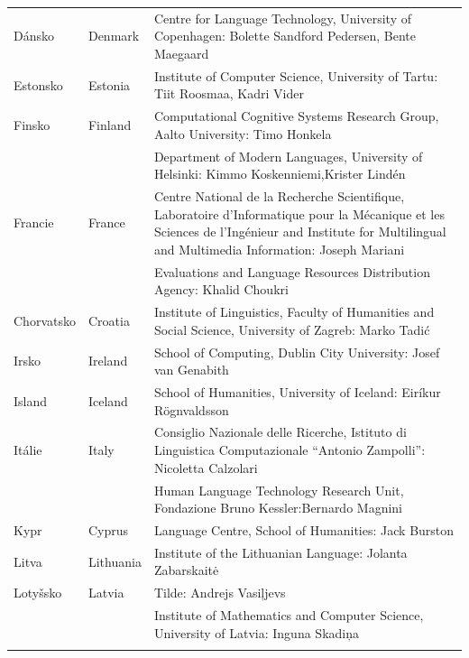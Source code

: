 \begin{longtable}{@{}llp{113mm}@{}}
  Dánsko &  \textcolor{grey1}{Denmark} & Centre for Language Technology, University of Copenhagen: \newline Bolette Sandford Pedersen, Bente Maegaard\\ \addlinespace
  Estonsko & \textcolor{grey1}{Estonia} & Institute of Computer Science, University of Tartu: Tiit Roosmaa, Kadri Vider\\ \addlinespace
  Finsko & \textcolor{grey1}{Finland} & Computational Cognitive Systems Research Group, Aalto University: Timo Honkela\\ \addlinespace
  & & Department of Modern Languages, University of Helsinki: Kimmo Koskenniemi,\newline Krister Lindén \\ \addlinespace
  Francie & \textcolor{grey1}{France} & Centre National de la Recherche Scientifique, Laboratoire d'Informatique pour la Mécanique et les Sciences de l'Ingénieur and Institute for Multilingual and Multimedia Information: Joseph Mariani \\ \addlinespace
  & & Evaluations and Language Resources Distribution Agency: Khalid Choukri\\ \addlinespace
  Chorvatsko & \textcolor{grey1}{Croatia} & Institute of Linguistics, Faculty of Humanities and Social Science, University of Zagreb: Marko Tadić \\ \addlinespace
  Irsko & \textcolor{grey1}{Ireland} & School of Computing, Dublin City University: Josef van Genabith\\ \addlinespace
  Island & \textcolor{grey1}{Iceland} & School of Humanities, University of Iceland: Eiríkur Rögnvaldsson\\ \addlinespace
  Itálie & \textcolor{grey1}{Italy} & Consiglio Nazionale delle Ricerche, Istituto di Linguistica Computazionale “Antonio Zampolli”: Nicoletta Calzolari\\ \addlinespace
  & & Human Language Technology Research Unit, Fondazione Bruno Kessler:\newline Bernardo Magnini\\ \addlinespace
  Kypr & \textcolor{grey1}{Cyprus} & Language Centre, School of Humanities: Jack Burston \\ \addlinespace
  Litva & \textcolor{grey1}{Lithuania} & Institute of the Lithuanian Language: Jolanta Zabarskaitė\\ \addlinespace
  Lotyšsko & \textcolor{grey1}{Latvia} & Tilde: Andrejs Vasiļjevs\\ \addlinespace 
  & & Institute of Mathematics and Computer Science, University of Latvia: Inguna Skadiņa\\ \addlinespace

\end{longtable}

